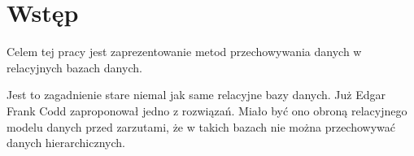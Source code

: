 \chapter*{Wstęp}


Celem tej pracy jest zaprezentowanie metod przechowywania danych w relacyjnych bazach danych. 

Jest to zagadnienie stare niemal jak same relacyjne bazy danych. Już Edgar Frank Codd zaproponował jedno z rozwiązań.
Miało być ono obroną relacyjnego modelu danych przed zarzutami, że w takich bazach nie można przechowywać danych hierarchicznych.





